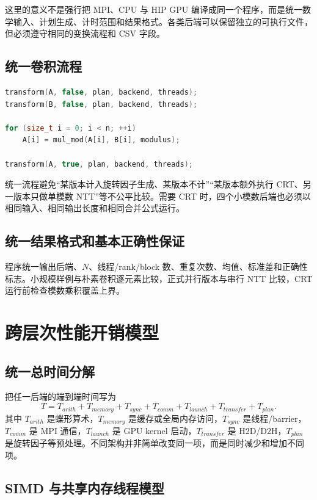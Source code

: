 这里的意义不是强行把 MPI、CPU 与 HIP GPU 编译成同一个程序，而是统一数学输入、计划生成、计时范围和结果格式。各类后端可以保留独立的可执行文件，但必须遵守相同的变换流程和 CSV 字段。

\subsection{统一卷积流程}

\begin{lstlisting}[title=所有后端共享的卷积流程,label={lst:common-flow},language={C++}]
transform(A, false, plan, backend, threads);
transform(B, false, plan, backend, threads);

for (size_t i = 0; i < n; ++i)
    A[i] = mul_mod(A[i], B[i], modulus);

transform(A, true, plan, backend, threads);
\end{lstlisting}

统一流程避免“某版本计入旋转因子生成、某版本不计”“某版本额外执行 CRT、另一版本只做单模数 NTT”等不公平比较。需要 CRT 时，四个小模数后端也必须以相同输入、相同输出长度和相同合并公式运行。

\subsection{统一结果格式和基本正确性保证}

程序统一输出后端、$N$、线程/rank/block 数、重复次数、均值、标准差和正确性标志。小规模样例与朴素卷积逐元素比较，正式并行版本与串行 NTT 比较，CRT 运行前检查模数乘积覆盖上界。

\section{跨层次性能开销模型}\newwork

\subsection{统一总时间分解}

把任一后端的端到端时间写为
\[
T=T_{arith}+T_{memory}+T_{sync}+T_{comm}
  +T_{launch}+T_{transfer}+T_{plan}.
\]
其中 $T_{arith}$ 是蝶形算术，$T_{memory}$ 是缓存或全局内存访问，$T_{sync}$ 是线程/barrier，$T_{comm}$ 是 MPI 通信，$T_{launch}$ 是 GPU kernel 启动，$T_{transfer}$ 是 H2D/D2H，$T_{plan}$ 是旋转因子等预处理。不同架构并非简单改变同一项，而是同时减少和增加不同项。

\subsection{SIMD 与共享内存线程模型}

